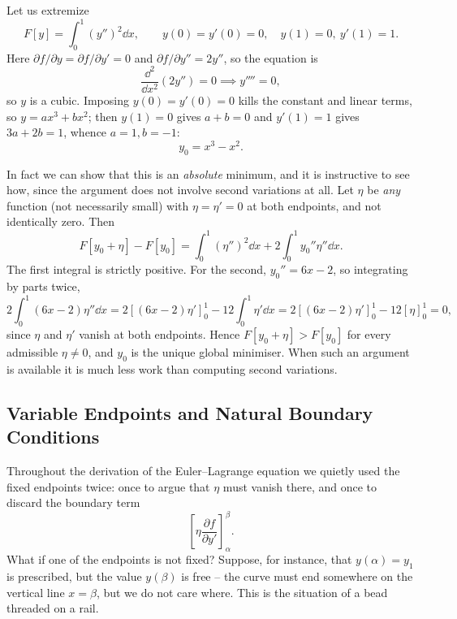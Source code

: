 \begin{example}
	Let us extremize
	$$
	F[y] = \int_0^1 (y'')^2 \dd x, \qquad y(0) = y'(0) = 0, \quad y(1) = 0, \ y'(1) = 1.
	$$
	Here $\partial f/\partial y = \partial f/\partial y' = 0$ and $\partial f/\partial y'' = 2y''$, so the equation is
	$$
	\frac{\dd^2}{\dd x^2}\left(2y''\right) = 0 \implies y'''' = 0,
	$$
	so $y$ is a cubic. Imposing $y(0) = y'(0) = 0$ kills the constant and linear terms, so $y = ax^3 + bx^2$; then $y(1) = 0$ gives $a + b = 0$ and $y'(1) = 1$ gives $3a + 2b = 1$, whence $a = 1, b = -1$:
	$$
	y_0 = x^3 - x^2.
	$$

	In fact we can show that this is an \emph{absolute} minimum, and it is instructive to see how, since the argument does not involve second variations at all. Let $\eta$ be \emph{any} function (not necessarily small) with $\eta = \eta' = 0$ at both endpoints, and not identically zero. Then
	$$
	F[y_0 + \eta] - F[y_0] = \int_0^1(\eta'')^2\dd x + 2\int_0^1 y_0''\eta''\dd x.
	$$
	The first integral is strictly positive. For the second, $y_0'' = 6x - 2$, so integrating by parts twice,
	$$
	2\int_0^1 (6x - 2)\eta''\dd x = 2\left[(6x-2)\eta'\right]_0^1 - 12\int_0^1 \eta'\dd x = 2\left[(6x-2)\eta'\right]_0^1 - 12\left[\eta\right]_0^1 = 0,
	$$
	since $\eta$ and $\eta'$ vanish at both endpoints. Hence $F[y_0 + \eta] > F[y_0]$ for every admissible $\eta \neq 0$, and $y_0$ is the unique global minimiser. When such an argument is available it is much less work than computing second variations.
\end{example}

\subsection{Variable Endpoints and Natural Boundary Conditions}\label{sec:naturalbc}

Throughout the derivation of the Euler--Lagrange equation we quietly used the fixed endpoints twice: once to argue that $\eta$ must vanish there, and once to discard the boundary term
$$
\left[\eta \frac{\partial f}{\partial y'}\right]_\alpha^\beta.
$$
What if one of the endpoints is not fixed? Suppose, for instance, that $y(\alpha) = y_1$ is prescribed, but the value $y(\beta)$ is free -- the curve must end somewhere on the vertical line $x = \beta$, but we do not care where. This is the situation of a bead threaded on a rail.

